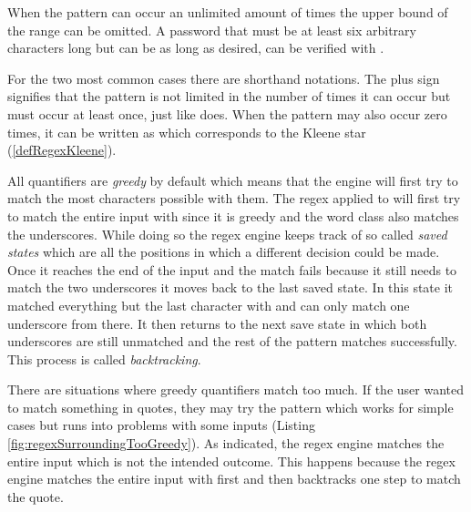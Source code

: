 When the pattern can occur an unlimited amount of times the upper bound of the range can be omitted. A password that must be at least six arbitrary characters long but can be as long as desired, can be verified with . 

For the two most common cases there are shorthand notations. The plus sign \pattern{\placeholder+} signifies that the pattern is not limited in the number of times it can occur but must occur at least once, just like  does. When the pattern may also occur zero times, it can be written as \pattern{\placeholder*} which corresponds to the Kleene star (\ref{defRegexKleene}).

All quantifiers are \emph{greedy} by default which means that the engine will first try to match the most characters possible with them. The regex  applied to  will first try to match the entire input with  since it is greedy and the word class also matches the underscores. While doing so the regex engine keeps track of so called \emph{saved states} which are all the positions in which a different decision could be made. Once it reaches the end of the input and the match fails because it still needs to match the two underscores it moves back to the last saved state. In this state it matched everything but the last character with  and can only match one underscore from there. It then returns to the next save state in which both underscores are still unmatched and the rest of the pattern matches successfully. This process is called \emph{backtracking}. 


There are situations where greedy quantifiers match too much. If the user wanted to match something in quotes, they may try the pattern  which works for simple cases but runs into problems with some inputs (Listing \ref{fig:regexSurroundingTooGreedy}). As indicated, the regex engine matches the entire input which is not the intended outcome. This happens because the regex engine matches the entire input with  first and then backtracks one step to match the quote.

\begin{listingBox}[title={Too greedy quantifier \pattern{".*"}},label=fig:regexSurroundingTooGreedy,width=12cm,center]
    \hspace{-5mm}
\end{listingBox}

